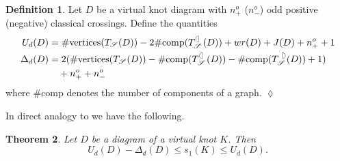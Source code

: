\documentclass[10pt,oneside]{amsart}
\newtheorem{theorem}{Theorem}[section]
\theoremstyle{definition}
\newtheorem{definition}[theorem]{Definition}
\numberwithin{equation}{section}
\DeclareRobustCommand{\CloseDef}{	\leavevmode\unskip\penalty9999 \hbox{}\nobreak\hfill
	\quad\hbox{$\lozenge$}}
\begin{document}
\begin{definition}
	\label{Def:doubledu}
	Let \( D \) be a virtual knot diagram with \( n^o_+ \) (\( n^o_- \)) odd positive (negative) classical crossings. Define the quantities
	\begin{equation}
		\begin{aligned}
			U_d ( D ) &= \# \text{vertices} ( T_{\mathscr{S}} ( D ) ) - 2 \# \text{comp} ( T^{\Leftcircle}_{\mathscr{S}} ( D ) ) + wr ( D ) + J ( D ) + n^o_+ +1 \\
			\Delta_d ( D ) &= 2 ( \# \text{vertices} ( T_{\mathscr{S}} ( D ) ) - \# \text{comp} ( T^{\Leftcircle}_{\mathscr{S}} ( D ) ) - \# \text{comp} ( T^{\Rightcircle}_{\mathscr{S}} ( D ) ) + 1 ) \\ 
			& \quad + n^o_+ + n^o_-
		\end{aligned}
	\end{equation}
	where \( \# \text{comp} \) denotes the number of components of a graph.\CloseDef
\end{definition}

In direct analogy to  we have the following.

\begin{theorem}
	\label{Thm:doubledbounds}
	Let \( D \) be a diagram of a virtual knot \( K \). Then
	\begin{equation}
		U_d ( D ) - \Delta_d ( D ) \leq s_1 ( K ) \leq U_d ( D ).
	\end{equation} 
\end{theorem}
\end{document}
